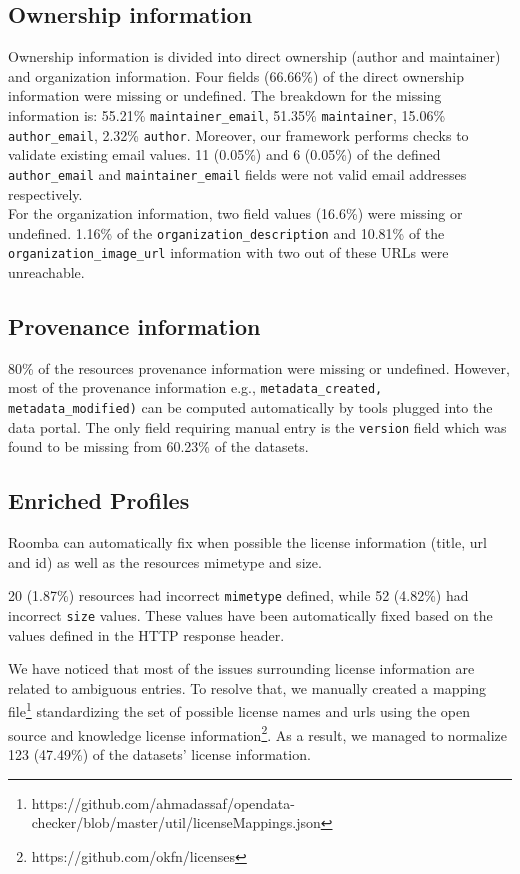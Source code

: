 \documentclass[runningheads,a4paper]{llncs}
\begin{document}
\subsection{Ownership information} Ownership information is divided into direct ownership (author and maintainer) and organization information. Four fields (66.66\%) of the direct ownership information were missing or undefined. The breakdown for the missing information is: 55.21\% \texttt{maintainer\_email}, 51.35\% \texttt{maintainer}, 15.06\% \texttt{author\_email}, 2.32\% \texttt{author}. Moreover, our framework performs checks to validate existing email values. 11 (0.05\%) and 6 (0.05\%) of the defined \texttt{author\_email} and \texttt{maintainer\_email} fields were not valid email addresses respectively.\\
For the organization information, two field values (16.6\%) were missing or undefined. 1.16\% of the \texttt{organization\_description} and 10.81\% of the \texttt{organization\-\_image\_url} information with two out of these URLs were unreachable.

\subsection{Provenance information} 80\% of the resources provenance information were missing or undefined. However, most of the provenance information e.g., \texttt{metadata\_created, \\metadata\_modified)} can be computed automatically by tools plugged into the data portal. The only field requiring manual entry is the \texttt{version} field which was found to be missing from 60.23\% of the datasets.

\subsection{Enriched Profiles}

Roomba can automatically fix when possible the license information (title, url and id) as well as the resources mimetype and size.

20 (1.87\%) resources had incorrect \texttt{mimetype} defined, while 52 (4.82\%) had incorrect \texttt{size} values. These values have been automatically fixed based on the values defined in the HTTP response header.

We have noticed that most of the issues surrounding license information are related to ambiguous entries. To resolve that, we manually created a mapping file\footnote{https://github.com/ahmadassaf/opendata-checker/blob/master/util/licenseMappings.json} standardizing the set of possible license names and urls using the open source and knowledge license information\footnote{https://github.com/okfn/licenses}. As a result, we managed to normalize 123 (47.49\%) of the datasets' license information.
\end{document}
